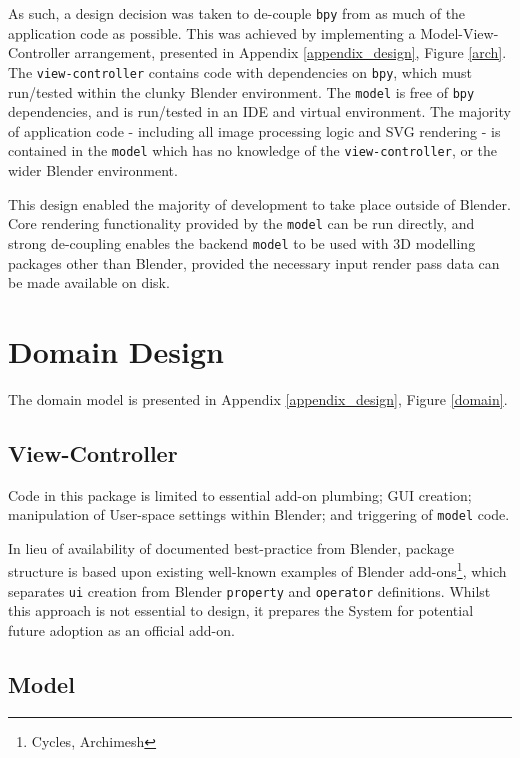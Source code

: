 {As such, a design decision was taken to de-couple \texttt{bpy} from as much of the application code as possible.
This was achieved by implementing a Model-View-Controller arrangement, presented in Appendix \ref{appendix_design}, Figure \ref{arch}.
The \texttt{view-controller} contains code with dependencies on \texttt{bpy}, which must run/tested within the clunky Blender environment. 
The \texttt{model} is free of \texttt{bpy} dependencies, and is run/tested in an IDE and virtual environment. 
The majority of application code - including all image processing logic and SVG rendering - is contained in the \texttt{model} which has no knowledge of the \texttt{view-controller}, or the wider Blender environment.

This design enabled the majority of development to take place outside of Blender.
Core rendering functionality provided by the \texttt{model} can be run directly, and strong de-coupling enables the backend \texttt{model} to be used with 3D modelling packages other than Blender, provided the necessary input render pass data can be made available on disk.

\section{Domain Design}

The domain model is presented in Appendix \ref{appendix_design}, Figure \ref{domain}.

\subsection{View-Controller}

Code in this package is limited to essential add-on plumbing; GUI creation; manipulation of User-space settings within Blender; and triggering of \texttt{model} code.

In lieu of availability of documented best-practice from Blender, package structure is based upon existing well-known examples of Blender add-ons\footnote{Cycles, Archimesh}, which separates \texttt{ui} creation from Blender \texttt{property} and \texttt{operator} definitions.
Whilst this approach is not essential to design, it prepares the System for potential future adoption as an official add-on.

\subsection{Model}

}
